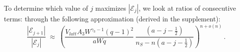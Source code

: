 \documentclass[journal=mamobx,manuscript=article]{achemso}
\begin{document}
To determine which value of $j$ maximizes $|\mathcal{E}_j|$, we look at ratios of consecutive terms:
through the following approximation (derived in the supplement):
\begin{equation}
    \label{eq.Yratio2}
       \frac{|\mathcal{E}_{j+1}|}{|\mathcal{E}_j|} \; \approx \; 
       \left(  \frac{ V_{latt}A_3W^{\gamma_3-1}(q-1)^2}{aWq} \,
          \frac{(a-j-\frac{1}{2})}{n_S-n(a-j-\frac{1}{2})} \right)^{n+o(n)}   \,.
\end{equation}
\end{document}
